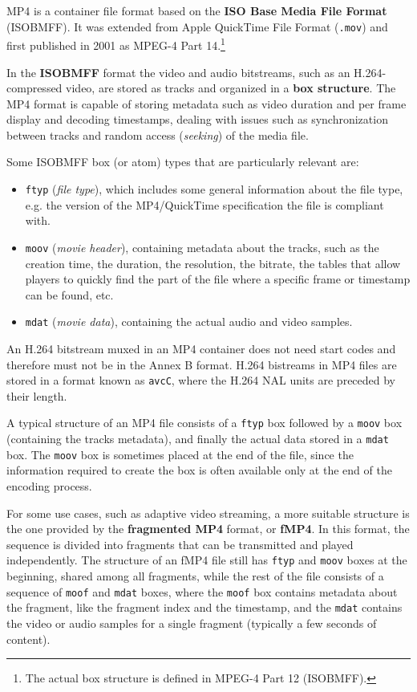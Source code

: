 MP4 is a container file format based on the \textbf{ISO Base Media File Format} (ISOBMFF). It was extended from Apple QuickTime File Format (\texttt{.mov}) and first published in 2001 as MPEG-4 Part 14.\footnote{The actual box structure is defined in MPEG-4 Part 12 (ISOBMFF).}\cite{mpeg4part12}

In the \textbf{ISOBMFF} format the video and audio bitstreams, such as an H.264-compressed video, are stored as tracks and organized in a \textbf{box structure}. The MP4 format is capable of storing metadata such as video duration and per frame display and decoding timestamps, dealing with issues such as synchronization between tracks and random access (\textit{seeking}) of the media file.

Some ISOBMFF box (or atom) types that are particularly relevant are:

\begin{itemize}
    \item \texttt{ftyp} (\textit{file type}), which includes some general information about the file type, e.g. the version of the MP4/QuickTime specification the file is compliant with.
    \item \texttt{moov} (\textit{movie header}), containing metadata about the tracks, such as the creation time, the duration, the resolution, the bitrate, the tables that allow players to quickly find the part of the file where a specific frame or timestamp can be found, etc.
    \item \texttt{mdat} (\textit{movie data}), containing the actual audio and video samples.
\end{itemize}

An H.264 bitstream muxed in an MP4 container does not need start codes and therefore must not be in the Annex B format. H.264 bistreams in MP4 files are stored in a format known as \texttt{avcC}, where the H.264 NAL units are preceded by their length.

A typical structure of an MP4 file consists of a \texttt{ftyp} box followed by a \texttt{moov} box (containing the tracks metadata), and finally the actual data stored in a \texttt{mdat} box. The \texttt{moov} box is sometimes placed at the end of the file, since the information required to create the box is often available only at the end of the encoding process.

For some use cases, such as adaptive video streaming, a more suitable structure is the one provided by the \textbf{fragmented MP4} format, or \textbf{fMP4}. In this format, the sequence is divided into fragments that can be transmitted and played independently. The structure of an fMP4 file still has \texttt{ftyp} and \texttt{moov} boxes at the beginning, shared among all fragments, while the rest of the file consists of a sequence of \texttt{moof} and \texttt{mdat} boxes, where the \texttt{moof} box contains metadata about the fragment, like the fragment index and the timestamp, and the \texttt{mdat} contains the video or audio samples for a single fragment (typically a few seconds of content).

